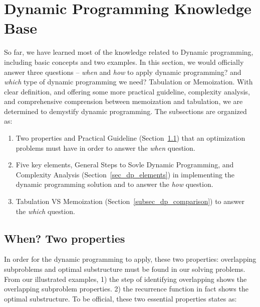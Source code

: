 \documentclass[../main.tex]{subfiles}
\begin{document}
\section{Dynamic Programming Knowledge Base}
\label{sec_dynamic_programming_knowledge_base}
So far, we have learned most of the knowledge related to Dynamic programming, including basic concepts and two examples. In this section, we would officially answer three questions -- \textit{when} and \textit{how} to apply dynamic programming? and \textit{which} type of dynamic programming we need? Tabulation or Memoization. With clear definition, and offering some more practical guideline, complexity analysis, and comprehensive comprension between memoization and tabulation, we are determined to demystify dynamic programming. The subsections are organized as:
\begin{enumerate}
    \item Two properties and Practical Guideline (Section~\ref{sec_dp_two_properties}) that an optimization problems must have in order to answer the \textit{when} question.
    \item Five key elements, General Steps to Sovle Dynamic Programming, and Complexity Analysis (Section~\ref{sec_dp_elements}) in implementing the dynamic programming solution and to answer the \textit{how} question.
    \item Tabulation VS Memoization (Section~\ref{subsec_dp_comparison}) to answer the \textit{which} question. 
\end{enumerate} 

\subsection{When? Two properties}
\label{sec_dp_two_properties}
In order for the dynamic programming to apply, these two properties: overlapping subproblems and optimal substructure must be found in our solving problems. From our illustrated examples, 1) the step of identifying overlapping shows the overlapping subproblem properties. 2) the recurrence function in fact  shows the optimal substructure.   To be official, these two essential properties states as: 
\end{document}
